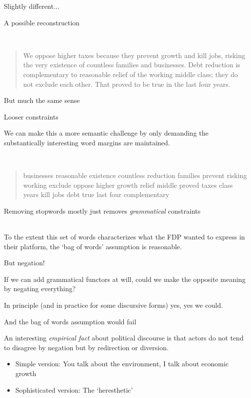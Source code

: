 \documentclass{hertieteaching}\usepackage[]{graphicx}\usepackage[]{color}
\begin{document}
\begin{frame}{Slightly different...}

A possible reconstruction

~\\
\begin{quote}
We oppose higher taxes because they prevent growth and
kill jobs, risking the very existence of
countless families and businesses. Debt reduction is
complementary to reasonable relief of the
working middle class; they do not exclude each other.
That proved to be true in the last four years.
\end{quote}

But much the same sense

\end{frame}
\begin{frame}{Looser constraints}

We can make this a more semantic challenge by only demanding
the substantically interesting word margins are maintained.

~\\
\begin{quote}
businesses reasonable existence countless
reduction families prevent risking working exclude oppose
higher growth relief middle proved taxes class years kill
jobs debt true last four complementary
\end{quote}

Removing stopwords mostly just removes \textit{grammatical} constraints

~\\
To the extent this set of words characterizes what the FDP wanted to express in their platform, the `bag of words' assumption is reasonable.

\end{frame}

\begin{frame}{But negation!}


If we can add grammatical functors at will, could we
make the opposite meaning by negating everything?

In principle (and in practice for some discursive forms) yes, yes we could.

And the bag of words assumption would fail

\pause

An interesting \textit{empirical fact} about political discourse is that
actors do not tend to disagree by negation but by redirection or
diversion.
\begin{itemize}
  \item Simple version: You talk about the environment, I talk about economic growth
  \item Sophisticated version: The `heresthetic' \parencite{Riker.etal1996}
\end{itemize}

\end{frame}
\end{document}
